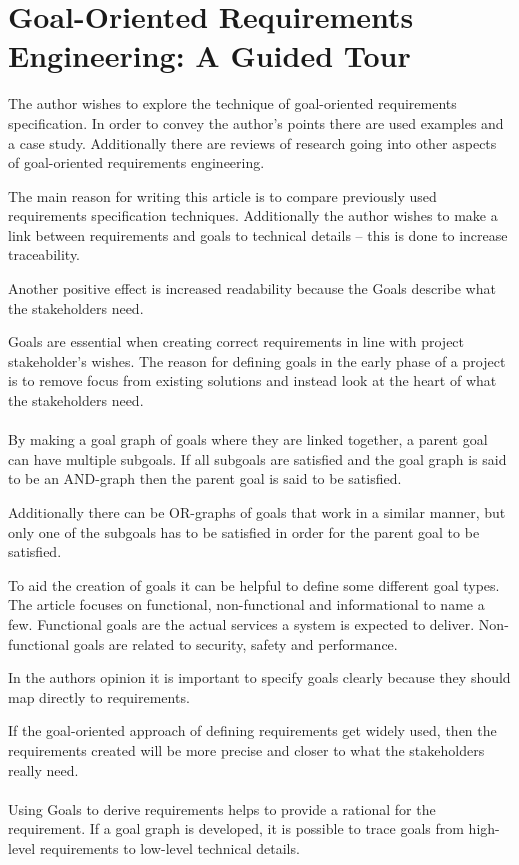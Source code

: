 \documentclass[Main]{subfiles}
\begin{document}
\section{Goal-Oriented Requirements Engineering: A Guided Tour}

The author wishes to explore the technique of goal-oriented requirements specification.
In order to convey the author's points there are used examples and a case study.
Additionally there are reviews of research going into other aspects of goal-oriented requirements engineering.

The main reason for writing this article is to compare previously used requirements specification techniques.
Additionally the author wishes to make a link between requirements and goals to technical details -- this is done to increase traceability.

Another positive effect is increased readability because the Goals describe what the stakeholders need.

Goals are essential when creating correct requirements in line with project stakeholder's wishes.
The reason for defining goals in the early phase of a project is to remove focus from existing solutions and instead look at the heart of what the stakeholders need.
\\
\\
By making a goal graph\cite[section 5.1]{Goal} of goals where they are linked together, a parent goal can have multiple subgoals.
If all subgoals are satisfied and the goal graph is said to be an AND-graph then the parent goal is said to be satisfied.

Additionally there can be OR-graphs of goals that work in a similar manner, but only one of the subgoals has to be satisfied in order for the parent goal to be satisfied.

To aid the creation of goals it can be helpful to define some different goal types.
The article focuses on functional, non-functional and informational to name a few.
Functional goals are the actual services a system is expected to deliver.
Non-functional goals are related to security, safety and performance.

In the authors opinion it is important to specify goals clearly because they should map directly to requirements\cite[p. 3]{Goal}.

If the goal-oriented approach of defining requirements get widely used, then the requirements created will be more precise and closer to what the stakeholders really need.
\\
\\
Using Goals to derive requirements helps to provide a rational for the requirement.
If a goal graph is developed, it is possible to trace goals from high-level requirements to low-level technical details\cite[p. 11]{Goal}.
\end{document}

